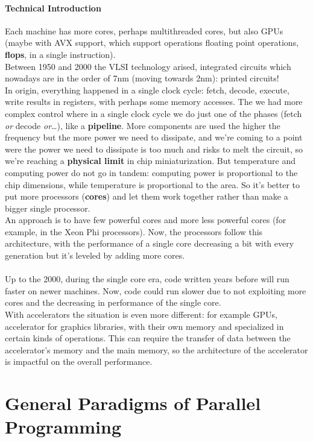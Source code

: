 \documentclass[10pt]{report}
\begin{document}
\paragraph{Technical Introduction} Each machine has more cores, perhaps multithreaded cores, but also GPUs (maybe with AVX support, which support operations floating point operations, \textbf{flops}, in a single instruction).\\
Between 1950 and 2000 the VLSI technology arised, integrated circuits which nowadays are in the order of 7nm (moving towards 2nm): printed circuits!\\
In origin, everything happened in a single clock cycle: fetch, decode, execute, write results in registers, with perhaps some memory accesses. The we had more complex control where in a single clock cycle we do just one of the phases (fetch \textit{or} decode \textit{or}\ldots), like a \textbf{pipeline}. More components are used the higher the frequency but the more power we need to dissipate, and we're coming to a point were the power we need to dissipate is too much and risks to melt the circuit, so we're reaching a \textbf{physical limit} in chip miniaturization. But temperature and computing power do not go in tandem: computing power is proportional to the chip dimensions, while temperature is proportional to the area. So it's better to put more processors (\textbf{cores}) and let them work together rather than make a bigger single processor.\\
An approach is to have few powerful cores and more less powerful cores (for example, in the Xeon Phi processors). Now, the processors follow this architecture, with the performance of a single core decreasing a bit with every generation but it's leveled by adding more cores.\\\\
Up to the 2000, during the single core era, code written years before will run faster on newer machines. Now, code could run slower due to not exploiting more cores and the decreasing in performance of the single core.\\With accelerators the situation is even more different: for example GPUs, accelerator for graphics libraries, with their own memory and specialized in certain kinds of operations. This can require the transfer of data between the accelerator's memory and the main memory, so the architecture of the accelerator is impactful on the overall performance.
\section{General Paradigms of Parallel Programming}
\end{document}

